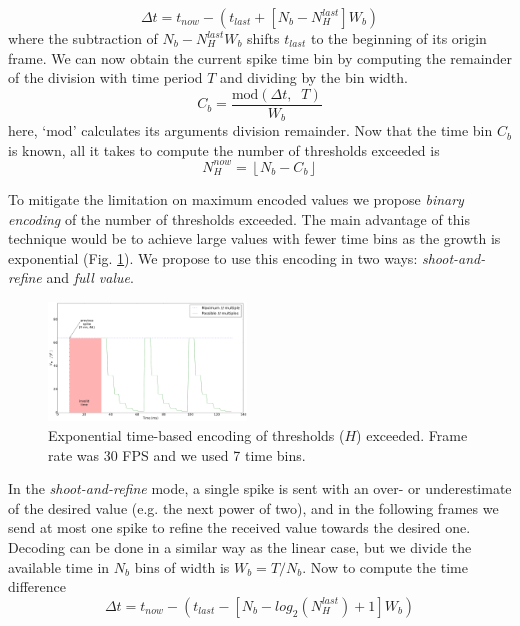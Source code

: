 \documentclass[conference]{IEEEtran}
\begin{document}
\begin{equation}
\Delta t = t_{now} -  \left(t_{last} + \left[N_{b} - N_{H}^{last}\right]W_{b}\right)
\label{eq:time_diff}
\end{equation}
where the subtraction of $N_{b} - N_{H}^{last}W_{b}$ shifts $t_{last}$ to the beginning of its origin frame. We can now obtain the current spike time bin by computing the remainder of the division with time period $T$ and dividing by the bin width.
\begin{equation}
C_{b} = \frac{\mathrm{mod}\left(\Delta t, \;\; T\right)}{W_{b}}
\label{eq:bin_compute}
\end{equation}
here, `$\mathrm{mod}$' calculates its arguments division remainder. Now that the time bin $C_{b}$ is known, all it takes to compute the number of thresholds exceeded is
\begin{equation}
 N_{H}^{now} = \left\lfloor N_{b} - C_{b} \right\rfloor
 \label{eq:new_Nh_linear}
\end{equation}

To mitigate the limitation on maximum encoded values  we propose \textit{binary encoding} of the number of thresholds exceeded. The main advantage of this technique would be to achieve large values with fewer time bins as the growth is exponential (Fig. \ref{fig:exponential_time}). We propose to use this encoding in two ways: \textit{shoot-and-refine} and \textit{full value}. 

\begin{figure}[htb]
  \centering
  \includegraphics[width=0.47\textwidth]{spike_values_exp}

  \caption{Exponential time-based encoding of thresholds ($H$) exceeded. Frame rate was 30 FPS and we used 7 time bins. }
  \label{fig:exponential_time}
\end{figure} 

In the \textit{shoot-and-refine} mode, a single spike is sent with an over- or underestimate of the desired value (e.g. the next power of two), and in the following frames we send at most one spike to refine the received value towards the desired one. Decoding can be done in a similar way as the linear case, but we divide the available time in $N_{b}$ bins of width is $W_{b} = T/N_{b}$. Now to compute the time difference
\begin{equation}
\Delta t = t_{now} - \left( t_{last} - 
                            \left[N_{b} - log_{2}(N_{H}^{last}) + 1\right]W_{b}
                     \right)
\label{eq:time_diff_exp}
\end{equation}
\end{document}
